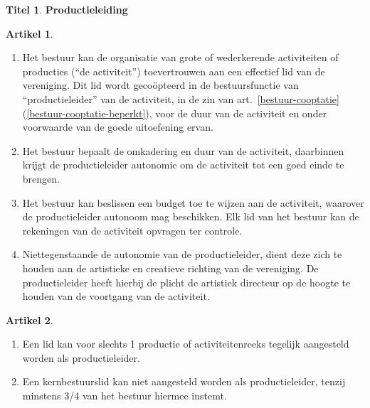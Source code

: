 \documentclass[a4paper,10pt]{article}
\theoremstyle{definition}
\newtheorem{titel}{\newline\Large Titel}
\newtheorem{artikelbase}{\large Artikel}
\newenvironment{artikel}
  {\begin{artikelbase}}
  {\smallskip
   \end{artikelbase}}
\newcommand{\ttext}[1]{\Large \textbf{#1} \normalsize}
\newcommand{\ttextenum}{\mbox{}}
\begin{document}
\begin{titel}\ttext{Productieleiding}

  \begin{artikel}\label{bestuur-productie}\ttextenum
    \begin{enumerate}
      \item
        Het bestuur kan de organisatie van grote of wederkerende activiteiten of producties (``de activiteit'') toevertrouwen aan een effectief lid van de vereniging.
        Dit lid wordt geco\"opteerd in de bestuursfunctie van ``productieleider'' van de activiteit, in de zin van art.~\ref{bestuur-cooptatie}(\ref{bestuur-cooptatie-beperkt}), voor de duur van de activiteit en onder voorwaarde van de goede uitoefening ervan.
      \item
        Het bestuur bepaalt de omkadering en duur van de activiteit, daarbinnen krijgt de productieleider autonomie om de activiteit tot een goed einde te brengen.
      \item
        Het bestuur kan beslissen een budget toe te wijzen aan de activiteit, waarover de productieleider autonoom mag beschikken.
        Elk lid van het bestuur kan de rekeningen van de activiteit opvragen ter controle.
      \item
        Niettegenstaande de autonomie van de productieleider, dient deze zich te houden aan de artistieke en creatieve richting van de vereniging.
        De productieleider heeft hierbij de plicht de artistiek directeur op de hoogte te houden van de voortgang van de activiteit.
    \end{enumerate}
  \end{artikel}

  \begin{artikel}\ttextenum
    \begin{enumerate}
      \item
        Een lid kan voor slechts 1 productie of activiteitenreeks tegelijk aangesteld worden als productieleider.
      \item
        Een kernbestuurslid kan niet aangesteld worden als productieleider, tenzij minstens 3/4 van het bestuur hiermee instemt.
    \end{enumerate}
  \end{artikel}


\end{titel}
\end{document}
